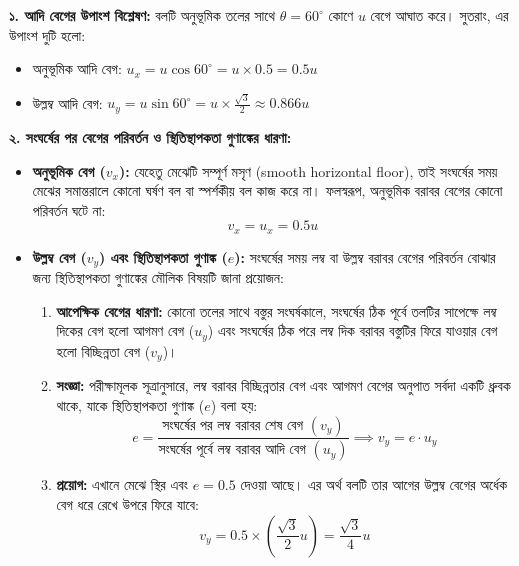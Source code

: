\documentclass[12pt, a4paper]{article}
\begin{document}
{\begin{tcolorbox}[solutionbox={সমাধান (Solution)}]
\vspace{0.5em}
\textbf{১. আদি বেগের উপাংশ বিশ্লেষণ:}
বলটি অনুভূমিক তলের সাথে $\theta = 60^\circ$ কোণে $u$ বেগে আঘাত করে। সুতরাং, এর উপাংশ দুটি হলো:
\begin{itemize}[leftmargin=1.5em, itemsep=0.2em]
    \item অনুভূমিক আদি বেগ: $u_x = u \cos 60^\circ = u \times 0.5 = 0.5u$
    \item উল্লম্ব আদি বেগ: $u_y = u \sin 60^\circ = u \times \frac{\sqrt{3}}{2} \approx 0.866u$
\end{itemize}

\vspace{0.5em}
\textbf{২. সংঘর্ষের পর বেগের পরিবর্তন ও স্থিতিস্থাপকতা গুণাঙ্কের ধারণা:}
\begin{itemize}[leftmargin=1.5em, itemsep=0.4em]
    \item \textbf{অনুভূমিক বেগ ($v_x$):} যেহেতু মেঝেটি সম্পূর্ণ মসৃণ (smooth horizontal floor), তাই সংঘর্ষের সময় মেঝের সমান্তরালে কোনো ঘর্ষণ বল বা স্পর্শকীয় বল কাজ করে না। ফলস্বরূপ, অনুভূমিক বরাবর বেগের কোনো পরিবর্তন ঘটে না:
    $$v_x = u_x = 0.5u$$
    \item \textbf{উল্লম্ব বেগ ($v_y$) এবং স্থিতিস্থাপকতা গুণাঙ্ক ($e$):} 
    সংঘর্ষের সময় লম্ব বা উল্লম্ব বরাবর বেগের পরিবর্তন বোঝার জন্য স্থিতিস্থাপকতা গুণাঙ্কের মৌলিক বিষয়টি জানা প্রয়োজন:
    \begin{enumerate}[label=(\alph*), leftmargin=1.5em, itemsep=0.2em]
        \item \textbf{আপেক্ষিক বেগের ধারণা:} কোনো তলের সাথে বস্তুর সংঘর্ষকালে, সংঘর্ষের ঠিক পূর্বে তলটির সাপেক্ষে লম্ব দিকের বেগ হলো আগমণ বেগ ($u_y$) এবং সংঘর্ষের ঠিক পরে লম্ব দিক বরাবর বস্তুটির ফিরে যাওয়ার বেগ হলো বিচ্ছিন্নতা বেগ ($v_y$)।
        \item \textbf{সংজ্ঞা:} পরীক্ষামূলক সূত্রানুসারে, লম্ব বরাবর বিচ্ছিন্নতার বেগ এবং আগমণ বেগের অনুপাত সর্বদা একটি ধ্রুবক থাকে, যাকে স্থিতিস্থাপকতা গুণাঙ্ক ($e$) বলা হয়:
        $$e = \frac{\text{সংঘর্ষের পর লম্ব বরাবর শেষ বেগ } (v_y)}{\text{সংঘর্ষের পূর্বে লম্ব বরাবর আদি বেগ } (u_y)} \implies v_y = e \cdot u_y$$
        \item \textbf{প্রয়োগ:} এখানে মেঝে স্থির এবং $e = 0.5$ দেওয়া আছে। এর অর্থ বলটি তার আগের উল্লম্ব বেগের অর্ধেক বেগ ধরে রেখে উপরে ফিরে যাবে:
        $$v_y = 0.5 \times \left(\frac{\sqrt{3}}{2} u\right) = \frac{\sqrt{3}}{4} u$$
    \end{enumerate}
\end{itemize}


\end{tcolorbox}}
\end{document}
